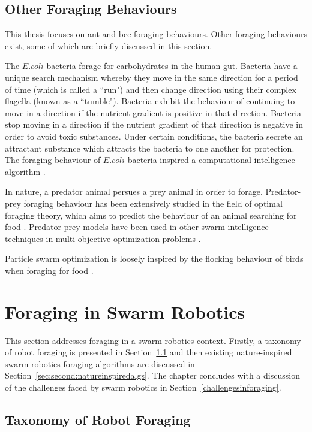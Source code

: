 \subsection{Other Foraging Behaviours}
\label{foraging:other}

This thesis focuses on ant and bee foraging behaviours. Other foraging behaviours exist, some of which are briefly discussed in this section.

The $E. coli$ bacteria forage for carbohydrates in the human gut. Bacteria have a unique search mechanism whereby they move in the same direction for a period of time (which is called a ``run") and then change direction using their complex flagella (known as a ``tumble"). Bacteria exhibit the behaviour of continuing to move in a direction if the nutrient gradient is positive in that direction. Bacteria stop moving in a direction if the nutrient gradient of that direction is negative in order to avoid toxic substances. Under certain conditions, the bacteria secrete an attractant substance which attracts the bacteria to one another for protection. The foraging behaviour of $E. coli$ bacteria inspired a computational intelligence algorithm \cite{passino2010bacterial}.

In nature, a predator animal persues a prey animal in order to forage. Predator-prey foraging behaviour has been extensively studied in the field of optimal foraging theory, which aims to predict the behaviour of an animal searching for food \cite{charnov1976optimal}. Predator-prey models have been used in other swarm intelligence techniques in multi-objective optimization problems \cite{nolfi1998coevolving}.

Particle swarm optimization is loosely inspired by the flocking behaviour of birds when foraging for food \cite{kennedy1995particle}.

\section{Foraging in Swarm Robotics}
\label{foraging:foraginginswarmrobotics}
This section addresses foraging in a swarm robotics context. Firstly, a taxonomy of robot foraging is presented in Section~\ref{sec:second:taxonomy} and then existing nature-inspired swarm robotics foraging algorithms are discussed in Section~\ref{sec:second:natureinspiredalgs}. The chapter concludes with a discussion of the challenges faced by swarm robotics in Section~\ref{challengesinforaging}.

\subsection{Taxonomy of Robot Foraging}
\label{sec:second:taxonomy}

